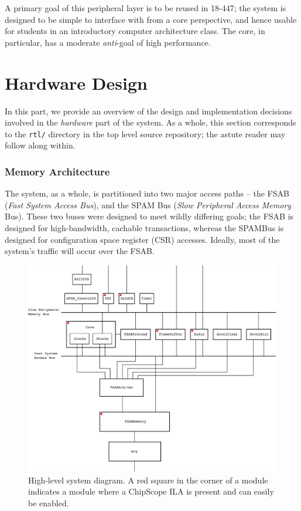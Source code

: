\documentclass[10pt]{article}
\begin{document}
A primary goal of this peripheral layer is to be reused in 18-447; the system
is designed to be simple to interface with from a core perspective, and
hence usable for students in an introductory computer architecture class. 
The core, in particular, has a moderate \textit{anti}-goal of high
performance.

\part{Hardware Design}

\label{par:hardware}

In this part, we provide an overview of the design and implementation
decisions involved in the \textit{hardware} part of the system.  As a whole,
this section corresponds to the \texttt{rtl/} directory in the top level
source repository; the astute reader may follow along within.

\section{Memory Architecture}

\label{sec:memory}

The system, as a whole, is partitioned into two major access paths -- the
FSAB (\textit{Fast System Access Bus}), and the SPAM Bus (\textit{Slow
Peripheral Access Memory} Bus).  These two buses were designed to meet
wildly differing goals; the FSAB is designed for high-bandwidth, cachable
transactions, whereas the SPAMBus is designed for configuration space
register (CSR) accesses.  Ideally, most of the system's traffic will occur
over the FSAB.

\begin{figure}
  \centering
    \includegraphics[width=.8\textwidth]{block_diagram.pdf}
  \caption{High-level system diagram. A red square in the corner of a module
           indicates a module where a ChipScope ILA is present and can easily
           be enabled.}
  \label{system_diagram}
\end{figure}
\end{document}
